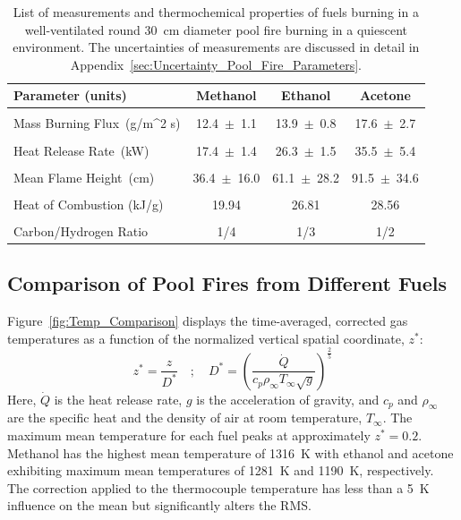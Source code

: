 \documentclass[12pt]{article}
\begin{document}
\begin{table}[!ht]
\caption[List of measurements and thermochemical properties of fuels]{List of measurements and thermochemical properties of fuels burning in a well-ventilated round 30~cm diameter pool fire burning in a quiescent environment. The uncertainties of measurements are discussed in detail in Appendix~\ref{sec:Uncertainty_Pool_Fire_Parameters}.}
\label{tab:Pool_Fire_Parameters_Table}
\centering
	\footnotesize
	\begin{tabular}{lccc}
\hline
\textbf{Parameter (units)} &\textbf{Methanol}& \textbf{Ethanol}& \textbf{Acetone}\\
\hline
\\[0.01cm]
Mass Burning Flux~(\si{g/{m^2 s}})		        	&	12.4~$\pm$~1.1		&	13.9~$\pm$~0.8	&	17.6~$\pm$~2.7\\
\\[0.01cm]
Heat Release Rate~(\si{kW})		            	&	17.4~$\pm$~1.4		&	26.3~$\pm$~1.5	&	35.5~$\pm$~5.4\\
\\[0.01cm]
Mean Flame Height~(\si{cm})			           &	36.4~$\pm$~16.0		&	61.1~$\pm$~28.2	&	91.5~$\pm$~34.6\\
\\[0.01cm]
Heat of Combustion (kJ/g)~\cite{SFPE}			&	19.94				&	26.81			&	28.56			\\	
\\[0.01cm]
Carbon/Hydrogen Ratio				         	&	1/4				&	1/3			&	1/2			\\
\hline
\end{tabular}
\end{table}

\subsection{Comparison of Pool Fires from Different Fuels}
\label{ssec:Fuel_comp}

Figure~\ref{fig:Temp_Comparison} displays the time-averaged, corrected gas temperatures as a function of the normalized vertical spatial coordinate, $z^*$:
\begin{equation}\label{eq:Z_Star}
z^*=\frac{z}{D^*}  \quad ; \quad  D^* = \left(\frac{\dot{Q}}{c_{p}\rho_\infty T_\infty \sqrt{g}}\right)^{\frac{2}{5}}
\end{equation}
Here, $\dot{Q}$ is the heat release rate, $g$ is the acceleration of gravity, and $c_p$ and $\rho_\infty$ are the specific heat and the density of air at room temperature, $T_\infty$. The maximum mean temperature for each fuel peaks at approximately $z^*=0.2$. Methanol has the highest mean temperature of 1316~K with ethanol and acetone exhibiting maximum mean temperatures of 1281~K and 1190~K, respectively. The correction applied to the thermocouple temperature has less than a 5~K influence on the mean but significantly alters the RMS.
\end{document}
